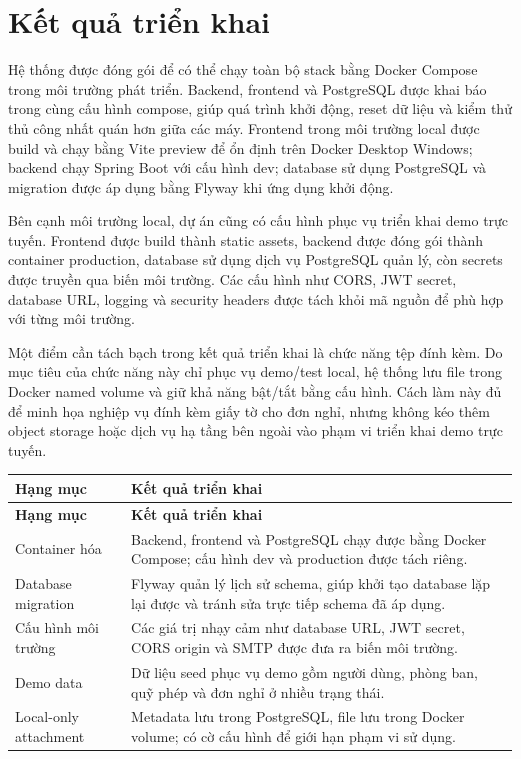 \section{Kết quả triển khai}
Hệ thống được đóng gói để có thể chạy toàn bộ stack bằng Docker Compose trong môi trường phát triển. Backend, frontend và PostgreSQL được khai báo trong cùng cấu hình compose, giúp quá trình khởi động, reset dữ liệu và kiểm thử thủ công nhất quán hơn giữa các máy. Frontend trong môi trường local được build và chạy bằng Vite preview để ổn định trên Docker Desktop Windows; backend chạy Spring Boot với cấu hình dev; database sử dụng PostgreSQL và migration được áp dụng bằng Flyway khi ứng dụng khởi động.

Bên cạnh môi trường local, dự án cũng có cấu hình phục vụ triển khai demo trực tuyến. Frontend được build thành static assets, backend được đóng gói thành container production, database sử dụng dịch vụ PostgreSQL quản lý, còn secrets được truyền qua biến môi trường. Các cấu hình như CORS, JWT secret, database URL, logging và security headers được tách khỏi mã nguồn để phù hợp với từng môi trường.

Một điểm cần tách bạch trong kết quả triển khai là chức năng tệp đính kèm. Do mục tiêu của chức năng này chỉ phục vụ demo/test local, hệ thống lưu file trong Docker named volume và giữ khả năng bật/tắt bằng cấu hình. Cách làm này đủ để minh họa nghiệp vụ đính kèm giấy tờ cho đơn nghỉ, nhưng không kéo thêm object storage hoặc dịch vụ hạ tầng bên ngoài vào phạm vi triển khai demo trực tuyến.

\begin{longtable}{p{}p{}}
\toprule
\textbf{Hạng mục} & \textbf{Kết quả triển khai} \\
\midrule
\endfirsthead
\toprule
\textbf{Hạng mục} & \textbf{Kết quả triển khai} \\
\midrule
\endhead
Container hóa & Backend, frontend và PostgreSQL chạy được bằng Docker Compose; cấu hình dev và production được tách riêng. \\
Database migration & Flyway quản lý lịch sử schema, giúp khởi tạo database lặp lại được và tránh sửa trực tiếp schema đã áp dụng. \\
Cấu hình môi trường & Các giá trị nhạy cảm như database URL, JWT secret, CORS origin và SMTP được đưa ra biến môi trường. \\
Demo data & Dữ liệu seed phục vụ demo gồm người dùng, phòng ban, quỹ phép và đơn nghỉ ở nhiều trạng thái. \\
Local-only attachment & Metadata lưu trong PostgreSQL, file lưu trong Docker volume; có cờ cấu hình để giới hạn phạm vi sử dụng. \\
\bottomrule
\end{longtable}

